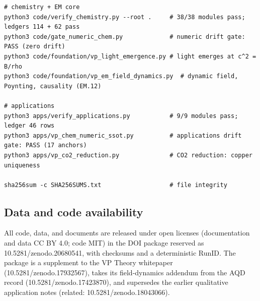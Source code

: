 \documentclass[
  10pt,
]{article}
\begin{document}
\begin{verbatim}
# chemistry + EM core
python3 code/verify_chemistry.py --root .     # 38/38 modules pass; ledgers 114 + 62 pass
python3 code/gate_numeric_chem.py             # numeric drift gate: PASS (zero drift)
python3 code/foundation/vp_light_emergence.py # light emerges at c^2 = B/rho
python3 code/foundation/vp_em_field_dynamics.py  # dynamic field, Poynting, causality (EM.12)

# applications
python3 apps/verify_applications.py           # 9/9 modules pass; ledger 46 rows
python3 apps/vp_chem_numeric_ssot.py          # applications drift gate: PASS (17 anchors)
python3 apps/vp_co2_reduction.py              # CO2 reduction: copper uniqueness

sha256sum -c SHA256SUMS.txt                   # file integrity
\end{verbatim}

\hypertarget{data-and-code-availability}{%
\subsection{Data and code
availability}\label{data-and-code-availability}}

All code, data, and documents are released under open licenses
(documentation and data CC BY 4.0; code MIT) in the DOI package reserved
as 10.5281/zenodo.20680541, with checksums and a deterministic RunID.
The package is a supplement to the VP Theory whitepaper
(10.5281/zenodo.17932567), takes its field-dynamics addendum from the
AQD record (10.5281/zenodo.17423870), and supersedes the earlier
qualitative application notes (related: 10.5281/zenodo.18043066).
\end{document}
